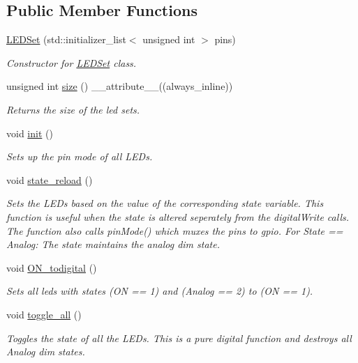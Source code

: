\subsection*{Public Member Functions}
\begin{DoxyCompactItemize}
\item 
\hyperlink{classLEDSet_a0d3339102ac73fb691f823bcd31a84b9}{L\+E\+D\+Set} (std\+::initializer\+\_\+list$<$ unsigned int $>$ pins)
\begin{DoxyCompactList}\small\item\em Constructor for \hyperlink{classLEDSet}{L\+E\+D\+Set} class. \end{DoxyCompactList}\item 
unsigned int \hyperlink{classLEDSet_a0d153646b1a750421af1f3617d90ad04}{size} () \+\_\+\+\_\+attribute\+\_\+\+\_\+((always\+\_\+inline))
\begin{DoxyCompactList}\small\item\em Returns the size of the led sets. \end{DoxyCompactList}\item 
void \hyperlink{classLEDSet_aae4545d8f8cb6e41a3c2960fb7369e48}{init} ()
\begin{DoxyCompactList}\small\item\em Sets up the pin mode of all L\+E\+Ds. \end{DoxyCompactList}\item 
void \hyperlink{classLEDSet_a520061aaf788486d2aa3aa3dfb3e32d6}{state\+\_\+reload} ()
\begin{DoxyCompactList}\small\item\em Sets the L\+E\+Ds based on the value of the corresponding state variable. This function is useful when the state is altered seperately from the digital\+Write calls. The function also calls pin\+Mode() which muxes the pins to gpio. For State == Analog\+: The state maintains the analog dim state. \end{DoxyCompactList}\item 
void \hyperlink{classLEDSet_a141bb664e7f58ae676455972ca9cd686}{O\+N\+\_\+todigital} ()
\begin{DoxyCompactList}\small\item\em Sets all leds with states (ON == 1) and (Analog == 2) to (ON == 1). \end{DoxyCompactList}\item 
void \hyperlink{classLEDSet_ae2bcd287ff637c2600603e83b0981c77}{toggle\+\_\+all} ()
\begin{DoxyCompactList}\small\item\em Toggles the state of all the L\+E\+Ds. This is a pure digital function and destroys all Analog dim states. \end{DoxyCompactList}\item 

\end{DoxyCompactItemize}
